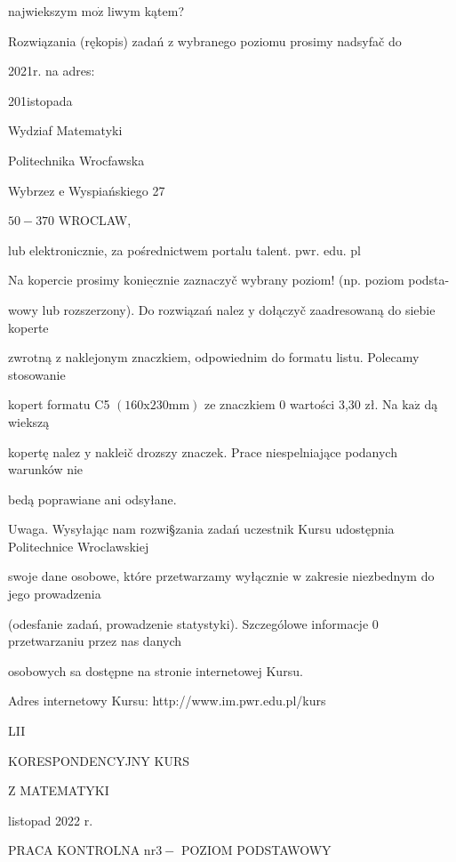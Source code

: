 \documentclass[a4paper,12pt]{article}
\begin{document}
najwiekszym $\mathrm{m}\mathrm{o}\dot{\mathrm{z}}$ liwym kątem?

Rozwiązania (rękopis) zadań z wybranego poziomu prosimy nadsyfač do

2021r. na adres:

201istopada

Wydziaf Matematyki

Politechnika Wrocfawska

Wybrzez $\mathrm{e}$ Wyspiańskiego 27

$50-370$ WROCLAW,

lub elektronicznie, za pośrednictwem portalu talent. $\mathrm{p}\mathrm{w}\mathrm{r}$. edu. pl

Na kopercie prosimy $\underline{\mathrm{k}\mathrm{o}\mathrm{n}\mathrm{i}\mathrm{e}\mathrm{c}\mathrm{z}\mathrm{n}\mathrm{i}\mathrm{e}}$ zaznaczyč wybrany poziom! (np. poziom podsta-

wowy lub rozszerzony). Do rozwiązań nalez $\mathrm{y}$ dołączyč zaadresowaną do siebie koperte

zwrotną $\mathrm{z}$ naklejonym znaczkiem, odpowiednim do formatu listu. Polecamy stosowanie

kopert formatu C5 $(160\mathrm{x}230\mathrm{m}\mathrm{m})$ ze znaczkiem $0$ wartości 3,30 zł. Na $\mathrm{k}\mathrm{a}\dot{\mathrm{z}}$ dą wiekszą

kopertę nalez $\mathrm{y}$ nakleič drozszy znaczek. Prace niespelniające podanych warunków nie

bedą poprawiane ani odsyłane.

Uwaga. Wysyłając nam rozwi\S zania zadań uczestnik Kursu udostępnia Politechnice Wroclawskiej

swoje dane osobowe, które przetwarzamy wyłącznie $\mathrm{w}$ zakresie niezbednym do jego prowadzenia

(odesfanie zadań, prowadzenie statystyki). Szczególowe informacje $0$ przetwarzaniu przez nas danych

osobowych sa dostępne na stronie internetowej Kursu.

Adres internetowy Kursu: http://www.im.pwr.edu.pl/kurs







LII

KORESPONDENCYJNY KURS

Z MATEMATYKI

listopad 2022 r.

PRACA KONTROLNA $\mathrm{n}\mathrm{r} 3-$ POZIOM PODSTAWOWY
\end{document}
